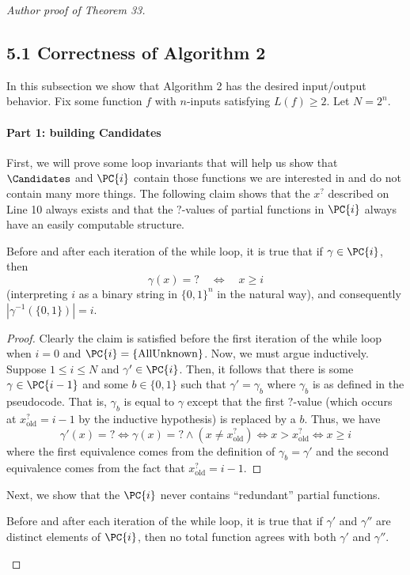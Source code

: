 \begin{proof}[Author proof of Theorem 33]
\subsection*{5.1 Correctness of Algorithm 2}
In this subsection we show that Algorithm 2 has the desired input/output behavior. Fix some function $f$ with $n$-inputs satisfying $L(f)\geq 2$. Let $N=2^n$.
\paragraph{Part 1: building Candidates}
First, we will prove some loop invariants that will help us show that $\Candidates$ and $\PC{i}$ contain those functions we are interested in and do not contain many more things.
The following claim shows that the $x^?$ described on Line 10 always exists and that the $?$-values of partial functions in $\PC{i}$ always have an easily computable structure.
\begin{ntclaim}
Before and after each iteration of the while loop, it is true that if $\gamma\in\PC{i}$, then
\[\gamma(x)=?\quad\Longleftrightarrow\quad x\geq i\]
(interpreting $i$ as a binary string in $\{0,1\}^n$ in the natural way), and consequently $|\gamma^{-1}(\{0,1\})|=i$.
\end{ntclaim}
\begin{proof}
Clearly the claim is satisfied before the first iteration of the while loop when $i=0$ and $\PC{i}=\{\operatorname{AllUnknown}\}$.
Now, we must argue inductively. Suppose $1\leq i\leq N$ and $\gamma'\in\PC{i}$. Then, it follows that there is some $\gamma\in\PC{i-1}$ and some $b\in\{0,1\}$ such that $\gamma'=\gamma_b$ where $\gamma_b$ is as defined in the pseudocode. That is, $\gamma_b$ is equal to $\gamma$ except that the first $?$-value (which occurs at $x^?_{\mathrm{old}}=i-1$ by the inductive hypothesis) is replaced by a $b$. Thus, we have
\[\gamma'(x)=?\Longleftrightarrow\gamma(x)=?\land(x\ne x^?_{\mathrm{old}})\Longleftrightarrow x>x^?_{\mathrm{old}}\Longleftrightarrow x\geq i\]
where the first equivalence comes from the definition of $\gamma_b=\gamma'$ and the second equivalence comes from the fact that $x^?_{\mathrm{old}}=i-1$.
\end{proof}
Next, we show that the $\PC{i}$ never contains ``redundant'' partial functions.
\begin{ntclaim}
Before and after each iteration of the while loop, it is true that if $\gamma'$ and $\gamma''$ are distinct elements of $\PC{i}$, then no total function agrees with both $\gamma'$ and $\gamma''$.

\end{ntclaim}
\end{proof}
